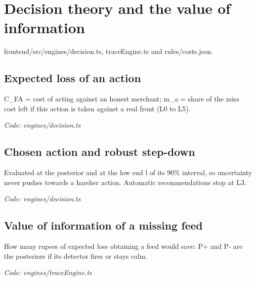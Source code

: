 \documentclass[11pt,a4paper]{article}
\newcommand{\where}[1]{\par{\small\itshape\color{mute}Code: #1}\par}
\begin{document}
\clearpage
\section{Decision theory and the value of information}
{\color{mute}frontend/src/engines/decision.ts, traceEngine.ts and rules/costs.json.}

\subsection*{Expected loss of an action}
\par\smallskip\noindent{}\par\smallskip
C\_FA = cost of acting against an honest merchant; m\_a = share of the miss cost left if this action is taken against a real front (L0 to L5).
\where{engines/decision.ts}

\subsection*{Chosen action and robust step-down}
\par\smallskip\noindent{}\par\smallskip
Evaluated at the posterior and at the low end l of its 90\% interval, so uncertainty never pushes towards a harsher action. Automatic recommendations stop at L3.
\where{engines/decision.ts}

\subsection*{Value of information of a missing feed}
\par\smallskip\noindent{}\par\smallskip
\par\smallskip\noindent{}\par\smallskip
How many rupees of expected loss obtaining a feed would save: P+ and P- are the posteriors if its detector fires or stays calm.
\where{engines/traceEngine.ts}
\end{document}
